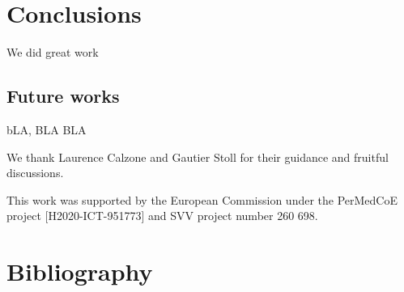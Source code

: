 \documentclass[times, twoside]{zHenriquesLab-StyleBioRxiv}
\begin{document}
\section*{Conclusions}

We did great work\\

\subsection*{Future works} 
bLA, BLA BLA


\begin{acknowledgements}
We thank Laurence Calzone and Gautier Stoll for their guidance and fruitful discussions.
\end{acknowledgements}

\begin{funding}
This work was supported by the European Commission under the PerMedCoE project [H2020-ICT-951773] and SVV project number 260 698.
\end{funding}


\section*{Bibliography}


\onecolumn
\newpage


\end{document}

